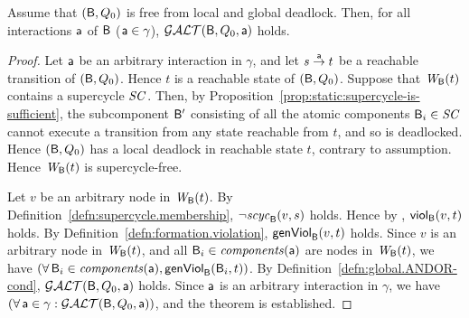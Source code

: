 \begin{theorem}
\label{theorem:gao-is-complete}
Assume that $(\B,Q_0)$ is free from local and global deadlock. 
Then,  for all interactions $\act$ of $\B$ (\ie $\act \in \gamma$), 
$\GAO(\B,Q_0,\act)$ holds.
\end{theorem}
%
\begin{proof}
Let $\act$ be an arbitrary interaction in $\gamma$, and let 
$s \goesto[\act] t$ be a reachable transition of $(\B, Q_0)$.
Hence $t$ is a reachable state of $(\B,Q_0)$.
Suppose that $\wfg{\B}{t}$ contains a supercycle $\SC$. Then, by 
Proposition~\ref{prop:static:supercycle-is-sufficient}, the
subcomponent $\B'$ consisting of all the atomic components $\B_i \in \SC$
cannot execute a transition from any state reachable from $t$, and so is deadlocked.
Hence $(\B,Q_0)$ has a local deadlock in reachable state $t$, contrary to assumption.
Hence $\wfg{\B}{t}$ is supercycle-free.

Let $v$ be an arbitrary node in $\wfg{\B}{t}$.
By Definition~\ref{defn:supercycle.membership}, $\neg \scyc{\B}{s}{v}$ holds.
Hence by , $\scV{v}{t}$ holds.
By Definition~\ref{defn:formation.violation},  $\genViol{v}{t}$ holds.
Since $v$ is an arbitrary node in $\wfg{\B}{t}$, and all $\B_i \in \comps{\act}$ are nodes in 
$\wfg{\B}{t}$, we have $(\fas \B_i \in \comps{\act}, \formViol{\B_i}{t})$.
By Definition~\ref{defn:global.ANDOR-cond}, $\GAO(\B, Q_0, \act)$ holds.
Since $\act$ is an arbitrary interaction in $\gamma$, we have
$(\fas \act \in \gamma: \GAO(\B,Q_0,\act))$, and the theorem is established.
\end{proof}